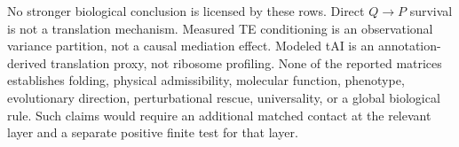 No stronger biological conclusion is licensed by these rows.  Direct $Q\to P$ survival is not a translation mechanism.  Measured TE conditioning is an observational variance partition, not a causal mediation effect.  Modeled tAI is an annotation-derived translation proxy, not ribosome profiling.  None of the reported matrices establishes folding, physical admissibility, molecular function, phenotype, evolutionary direction, perturbational rescue, universality, or a global biological rule.  Such claims would require an additional matched contact at the relevant layer and a separate positive finite test for that layer.
